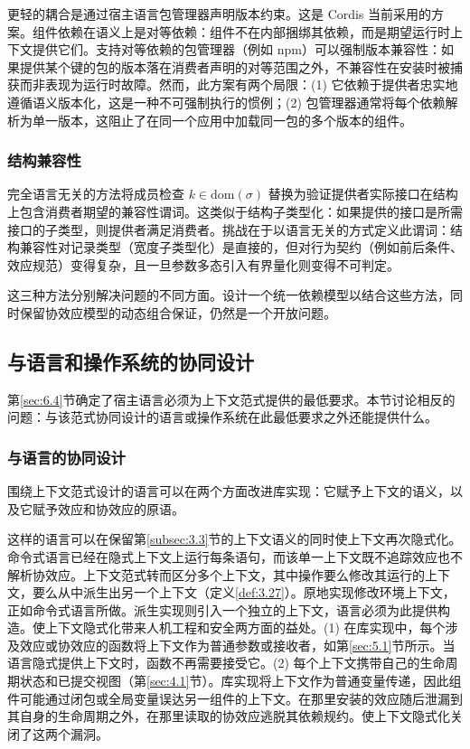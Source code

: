 更轻的耦合是通过宿主语言包管理器声明版本约束\cite{ref72}。这是 Cordis 当前采用的方案。组件依赖在语义上是对等依赖：组件不在内部捆绑其依赖，而是期望运行时上下文提供它们。支持对等依赖的包管理器（例如 npm）可以强制版本兼容性：如果提供某个键的包的版本落在消费者声明的对等范围之外，不兼容性在安装时被捕获而非表现为运行时故障。然而，此方案有两个局限：(1) 它依赖于提供者忠实地遵循语义版本化，这是一种不可强制执行的惯例；(2) 包管理器通常将每个依赖解析为单一版本，这阻止了在同一个应用中加载同一包的多个版本的组件。

\subsubsection{结构兼容性}

完全语言无关的方法将成员检查 $k \in \mathrm{dom}(\sigma)$ 替换为验证提供者实际接口在结构上包含消费者期望的兼容性谓词。这类似于结构子类型化\cite{ref73}：如果提供的接口是所需接口的子类型，则提供者满足消费者。挑战在于以语言无关的方式定义此谓词：结构兼容性对记录类型（宽度子类型化）是直接的，但对行为契约（例如前后条件\cite{ref74}、效应规范\cite{ref22}）变得复杂，且一旦参数多态引入有界量化则变得不可判定\cite{ref75}。

这三种方法分别解决问题的不同方面。设计一个统一依赖模型以结合这些方法，同时保留协效应模型的动态组合保证，仍然是一个开放问题。

\subsection{与语言和操作系统的协同设计}\label{sec:6.7}

第\ref{sec:6.4}节确定了宿主语言必须为上下文范式提供的最低要求。本节讨论相反的问题：与该范式协同设计的语言或操作系统在此最低要求之外还能提供什么。

\subsubsection{与语言的协同设计}

围绕上下文范式设计的语言可以在两个方面改进库实现：它赋予上下文的语义，以及它赋予效应和协效应的原语。

这样的语言可以在保留第\ref{subsec:3.3}节的上下文语义的同时使上下文再次隐式化。命令式语言已经在隐式上下文上运行每条语句，而该单一上下文既不追踪效应也不解析协效应。上下文范式转而区分多个上下文，其中操作要么修改其运行的上下文，要么从中派生出另一个上下文（定义\ref{def:3.27}）。原地实现修改环境上下文，正如命令式语言所做。派生实现则引入一个独立的上下文，语言必须为此提供构造。使上下文隐式化带来人机工程和安全两方面的益处。(1) 在库实现中，每个涉及效应或协效应的函数将上下文作为普通参数或接收者，如第\ref{sec:5.1}节所示。当语言隐式提供上下文时，函数不再需要接受它。(2) 每个上下文携带自己的生命周期状态和已提交视图（第\ref{sec:4.1}节）。库实现将上下文作为普通变量传递，因此组件可能通过闭包或全局变量误达另一组件的上下文。在那里安装的效应随后泄漏到其自身的生命周期之外，在那里读取的协效应逃脱其依赖规约。使上下文隐式化关闭了这两个漏洞。

